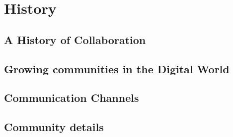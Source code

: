 \chapter{History}

\section{A History of Collaboration}

\section{Growing communities in the Digital World}
%

\section{Communication Channels}

\section{Community details}
